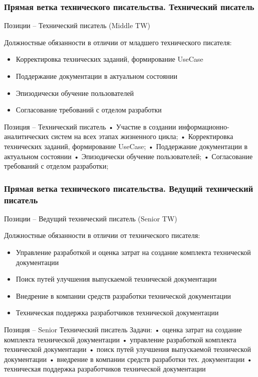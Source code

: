 \documentclass{../industrial-development}
\begin{document}
\begin{frame} \frametitle{Прямая ветка технического писательства. Технический писатель }
  \begin{block}{}
  \alert{Позиции – Технический писатель (Middle TW) }

Должностные обязанности в отличии от младшего технического писателя: 
  \end{block}
  \begin{itemize}
  \item Корректировка технических заданий, формирование UseCase
  \item  Поддержание документации в актуальном состоянии
  \item Эпизодически обучение пользователей
 \item 	Согласование требований с отделом разработки
  \end{itemize}
\end{frame}


\lecturenotes
Позиция –  Технический писатель
•	Участие в создании информационно-аналитических систем на всех этапах жизненного цикла;
•	Корректировка технических заданий, формирование UseCase;
•	Поддержание документации в актуальном состоянии
•	Эпизодически обучение пользователей;
•	Согласование требований с отделом разработки;

\begin{frame} \frametitle{Прямая ветка технического писательства. Ведущий технический писатель }
  \begin{block}{}
  \alert{Позиции – Ведущий технический писатель (Senior TW) }

Должностные обязанности в отличии от технического писателя: 
  \end{block}
  \begin{itemize}
  \item Управление разработкой и оценка затрат на создание комплекта технической документации
  \item Поиск путей улучшения выпускаемой технической документации
  \item Внедрение в компании средств разработки технической документации
 \item 	 Техническая поддержка разработчиков технической документации
  \end{itemize}
\end{frame}

\lecturenotes
Позиция – Senior Технический писатель
Задачи:
•	оценка затрат на создание комплекта технической документации 
•	управление разработкой комплекта технической документации
•	поиск путей улучшения выпускаемой технической документации 
•	внедрение в компании средств разработки тех. документации 
•	 техническая поддержка разработчиков технической документации
\end{document}
